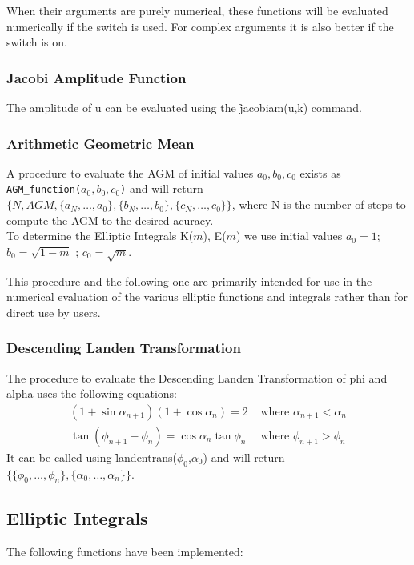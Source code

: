 When their arguments are purely numerical, these functions  will be evaluated
numerically if the  switch is used. For
complex arguments it is also better if the  switch is on.

\subsubsection{Jacobi Amplitude Function}
The amplitude of u can be evaluated using the 
\f{jacobiam(u,k)} command.

\subsubsection{Arithmetic Geometric Mean}
A procedure to evaluate the AGM of initial values \(a_0,b_0,c_0\) 
exists as \\
\texttt{AGM\_function(\(a_0,b_0,c_0\))} and will return \\
$\{ N, AGM, \{ a_N, \ldots ,a_0\}, \{ b_N, \ldots ,b_0\}, 
\{c_N, \ldots ,c_0\}\}$, 
where N is the number of steps to compute the AGM to the 
desired acuracy. \\

To determine the Elliptic Integrals K($m$), E($m$) we use initial values
\(a_0 = 1\); \(b_0 = \sqrt{1-m}\) ; \(c_0 = \sqrt{m}\).

This procedure and the following one are primarily intended for use in the
numerical evaluation of the various elliptic functions and integrals rather
than for direct use by users.

\subsubsection{Descending Landen Transformation}
The procedure to evaluate the Descending Landen Transformation of 
phi and alpha uses the following equations:
\begin{align*}
 (1+\sin \alpha_{n+1})(1+\cos \alpha_n)=2 &\text{ where } \alpha_{n+1}<\alpha_n \\
  \tan(\phi_{n+1}-\phi_n)=\cos \alpha_n \tan \phi_n & \text{ where } \phi_{n+1}>\phi_n
\end{align*}
It can be called using \f{landentrans}($\phi_0$,$\alpha_0$)
and will return \\
$\{\{\phi_0, \ldots ,\phi_n\},\{\alpha_0, \ldots ,\alpha_n\}\}$.

\subsection{Elliptic Integrals}
The following functions have been implemented:


